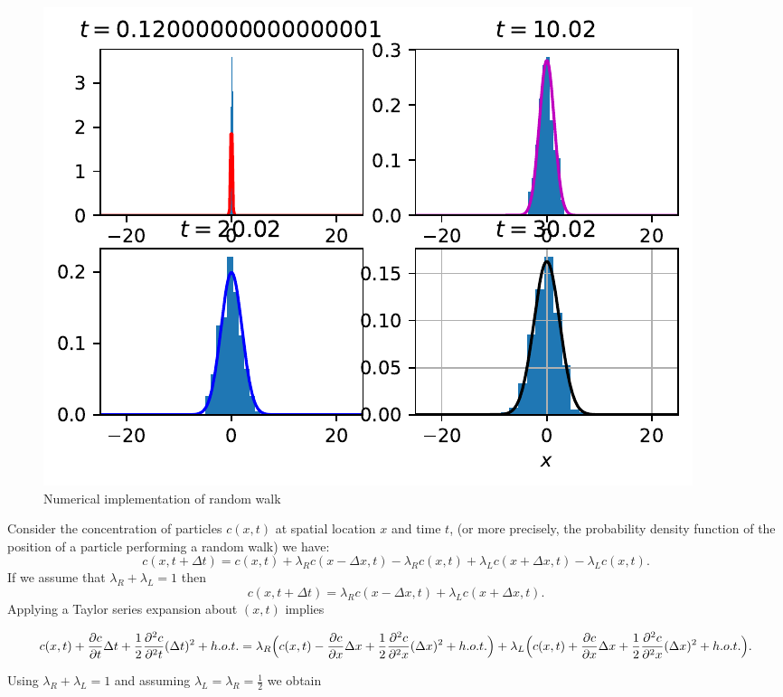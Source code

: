 \documentclass[
  letterpaper,
  DIV=11,
  numbers=noendperiod]{scrreprt}
\theoremstyle{plain}
\theoremstyle{definition}
\theoremstyle{plain}
\theoremstyle{remark}
\begin{document}
\begin{figure}

{\centering \includegraphics{linearreactiondiffusion_files/figure-pdf/fig-randomwalksim-output-1.pdf}

}

\caption{\label{fig-randomwalksim}Numerical implementation of random
walk}

\end{figure}

Consider the concentration of particles \(c(x,t)\) at spatial location
\(x\) and time \(t\), (or more precisely, the probability density
function of the position of a particle performing a random walk) we
have: \[
c(x, t+ \Delta t) = c(x, t)  + \lambda_R c(x- \Delta x, t) - \lambda_R c(x, t) + \lambda_L c(x+ \Delta x, t) - \lambda_L c (x,t).
\] If we assume that \(\lambda_R+ \lambda_L =1\) then \[
c(x, t+ \Delta t) =  \lambda_R c(x- \Delta x, t) + \lambda_L c(x+ \Delta x, t).
\] Applying a Taylor series expansion about \((x,t)\) implies

\[
c(x,t) + \frac{ \partial c}{\partial t} \Delta t + \frac 12  \frac{ \partial^2 c}{\partial^2 t} (\Delta t )^2  + h.o.t. =
\lambda_R \Big( c(x,t) - \frac{ \partial c}{\partial x} \Delta x + \frac 12  \frac{ \partial^2 c}{\partial^2 x} (\Delta x )^2  + h.o.t. \Big)\\ +
\lambda_L \Big( c(x,t) + \frac{ \partial c}{\partial x} \Delta x + \frac 12  \frac{ \partial^2 c}{\partial^2 x} (\Delta x )^2  + h.o.t. \Big).
\]

Using \(\lambda_R+ \lambda_L =1\) and assuming
\(\lambda_L = \lambda_R = \frac 12\) we obtain
\end{document}
